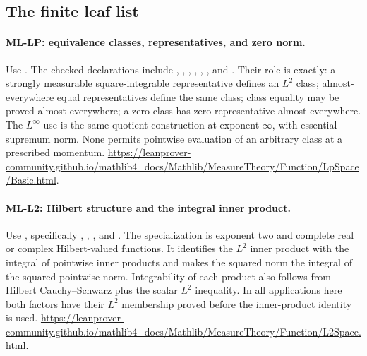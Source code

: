 \documentclass[11pt,a4paper]{article}
\theoremstyle{remark}\newtheorem{remark}[theorem]{Remark}
\begin{document}
\subsection{The finite leaf list}
\hypertarget{leaf:ML-LP}{}\paragraph{ML-LP: equivalence classes, representatives, and zero norm.}
Use . The checked declarations include
,
,
,
,
,
, and
.
Their role is exactly: a strongly measurable square-integrable representative defines an $L^2$ class; almost-everywhere equal representatives define the same class; class equality may be proved almost everywhere; a zero class has zero representative almost everywhere. The $L^\infty$ use is the same quotient construction at exponent $\infty$, with essential-supremum norm. None permits pointwise evaluation of an arbitrary class at a prescribed momentum.
\url{https://leanprover-community.github.io/mathlib4_docs/Mathlib/MeasureTheory/Function/LpSpace/Basic.html}.

\hypertarget{leaf:ML-L2}{}\paragraph{ML-L2: Hilbert structure and the integral inner product.}
Use , specifically
,
,
, and
.
The specialization is exponent two and complete real or complex Hilbert-valued functions. It identifies the $L^2$ inner product with the integral of pointwise inner products and makes the squared norm the integral of the squared pointwise norm. Integrability of each product also follows from Hilbert Cauchy--Schwarz plus the scalar $L^2$ inequality. In all applications here both factors have their $L^2$ membership proved before the inner-product identity is used.
\url{https://leanprover-community.github.io/mathlib4_docs/Mathlib/MeasureTheory/Function/L2Space.html}.
\end{document}
